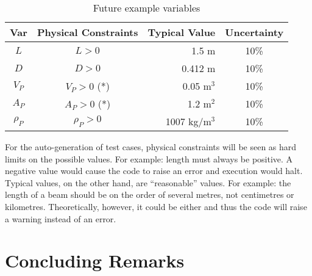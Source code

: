 \documentclass{sig-alternate-05-2015}
\begin{document}
\begin{table} \label{tab:pcm}
\centering
\caption{Future example variables}
\begin{tabular}{|c|c|r|c|} \hline
\textbf{Var} & \textbf{Physical Constraints} & \textbf{Typical Value} & \textbf{Uncertainty}\\ \hline
$L$ & $L > 0$ & 1.5 m & 10\% \\ \hline
$D$ & $D > 0$ & 0.412 m & 10\% \\ \hline
$V_P$ & $V_P > 0$ (*)	& 0.05 m$^3$	& 10\% \\ \hline
$A_P$ & $A_P > 0$ (*)	& 1.2 m$^2$	& 10\% \\ \hline
$\rho_P$ & $\rho_P > 0$	& 1007 kg/m$^3$	& 10\% \\
\hline\end{tabular}
\end{table}

For the auto-generation of test cases, physical constraints will be seen as hard
limits on the possible values. For example: length must always be positive.  A
negative value would cause the code to raise an error and execution would
halt. Typical values, on the other hand, are ``reasonable'' values. For example:
the length of a beam should be on the order of several metres, not centimetres
or kilometres. Theoretically, however, it could be either and thus the code will
raise a warning instead of an error.

    
\section{Concluding Remarks} \label{sec:conclusion}


%
\end{document}
